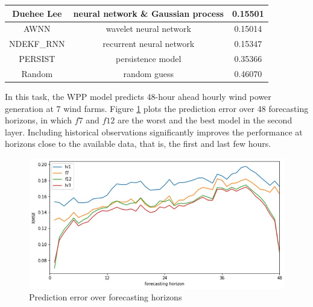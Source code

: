 \documentclass[conference]{IEEEtran}
\begin{document}
\begin{table}
\begin{center}
{\begin{tabular}{|c|c|c|}
Duehee Lee \cite{HONG2014357}         & neural network \& Gaussian process & 0.15501  \\ \hline
AWNN \cite{7894735}     & wavelet neural network    & 0.15014           \\ \hline
NDEKF\_RNN \cite{Kanna13} & recurrent neural network  & 0.15347           \\ \hline
PERSIST                 & persistence model         & 0.35366           \\ \hline
Random                  & random guess              & 0.46070           \\ \hline
\end{tabular}
}
\label{tab:RMSE}
\end{center}
\end{table}

In this task, the WPP model predicts 48-hour ahead hourly wind power generation at 7 wind farms. Figure \ref{fig:horizon} plots the prediction error over 48 forecasting horizons, in which $f7$ and $f12$ are the worst and the best model in the second layer. Including historical observations significantly improves the performance at horizons close to the available data, that is, the first and last few hours. %

\begin{figure}[b]
\vspace*{-1mm}
\centering
\includegraphics[width=0.9\columnwidth]{FIG/horizon}
\caption{Prediction error over forecasting horizons}
\label{fig:horizon}
\end{figure}

\end{document}
